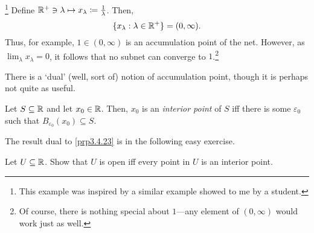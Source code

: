 \begin{exm}\label{exm3.4.29}\footnote{This example was inspired by a similar example showed to me by a student.}
Define $\mathbb{R} ^+\ni \lambda \mapsto x_\lambda \coloneqq \frac{1}{\lambda}$.  Then,
\begin{equation}
\{ x_\lambda :\lambda \in \mathbb{R} ^+\} =(0,\infty ).
\end{equation}
Thus, for example, $1\in (0,\infty )$ is an accumulation point of the net.  However, as $\lim _\lambda x_\lambda =0$, it follows that no subnet can converge to $1$.\footnote{Of course, there is nothing special about $1$---any element of $(0,\infty )$ would work just as well.}
\end{exm}

There is a `dual' (well, sort of) notion of accumulation point, though it is perhaps not quite as useful.
\begin{dfn}
Let $S\subseteq \mathbb{R}$ and let $x_0\in \mathbb{R}$.  Then, $x_0$ is an \emph{interior point} of $S$ iff there is some $\varepsilon _0$ such that $B_{\varepsilon _0}(x_0)\subseteq S$.
\end{dfn}
The result dual to \cref{prp3.4.23} is in the following easy exercise.
\begin{exr}\label{exr3.4.26}
Let $U\subseteq \mathbb{R}$.  Show that $U$ is open iff every point in $U$ is an interior point.
\end{exr}


